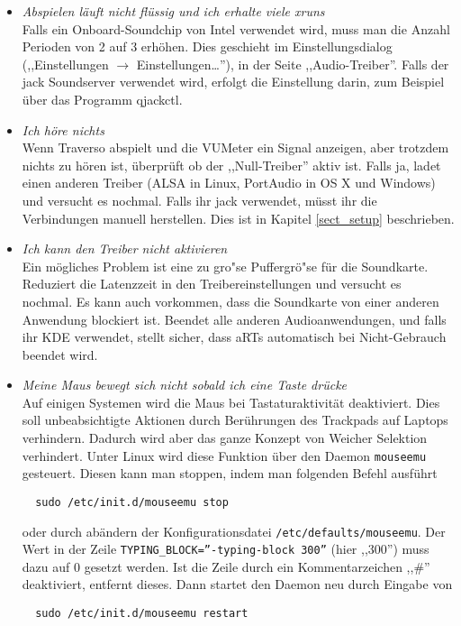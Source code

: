 \begin{itemize}
 \item \textit{Abspielen läuft nicht flüssig und ich erhalte viele xruns}\\
  Falls ein Onboard-Soundchip von Intel verwendet wird, muss man die Anzahl Perioden von 2 auf 3 erhöhen. Dies geschieht im Einstellungsdialog (,,Einstellungen $\rightarrow$ Einstellungen\dots''), in der Seite ,,Audio-Treiber''. Falls der jack Soundserver verwendet wird, erfolgt die Einstellung darin, zum Beispiel über das Programm qjackctl.

 \item \textit{Ich höre nichts}\\
  Wenn Traverso abspielt und die VUMeter ein Signal anzeigen, aber trotzdem nichts zu hören ist, überprüft ob der ,,Null-Treiber'' aktiv ist. Falls ja, ladet einen anderen Treiber (ALSA in Linux, PortAudio in OS X und Windows) und versucht es nochmal. Falls ihr jack verwendet, müsst ihr die Verbindungen manuell herstellen. Dies ist in Kapitel \ref{sect_setup} beschrieben.

 \item \textit{Ich kann den Treiber nicht aktivieren}\\
  Ein mögliches Problem ist eine zu gro"se Puffergrö"se für die Soundkarte. Reduziert die Latenzzeit in den Treibereinstellungen und versucht es nochmal. Es kann auch vorkommen, dass die Soundkarte von einer anderen Anwendung blockiert ist. Beendet alle anderen Audioanwendungen, und falls ihr KDE verwendet, stellt sicher, dass aRTs automatisch bei Nicht-Gebrauch beendet wird.

 \item \textit{Meine Maus bewegt sich nicht sobald ich eine Taste drücke}\\
  Auf einigen Systemen wird die Maus bei Tastaturaktivität deaktiviert. Dies soll unbeabsichtigte Aktionen durch Berührungen des Trackpads auf Laptops verhindern. Dadurch wird aber das ganze Konzept von Weicher Selektion verhindert. Unter Linux wird diese Funktion über den Daemon \texttt{mouseemu} gesteuert. Diesen kann man stoppen, indem man folgenden Befehl ausführt
  \begin{verbatim}
  sudo /etc/init.d/mouseemu stop
  \end{verbatim}
  oder durch abändern der Konfigurationsdatei  \texttt{/etc/defaults/mouseemu}. Der Wert in der Zeile \texttt{TYPING\_BLOCK=''-typing-block 300''} (hier ,,300'') muss dazu auf 0 gesetzt werden. Ist die Zeile durch ein Kommentarzeichen ,,\#'' deaktiviert, entfernt dieses. Dann startet den Daemon neu durch Eingabe von
 \begin{verbatim}
  sudo /etc/init.d/mouseemu restart
  \end{verbatim}


\end{itemize}
